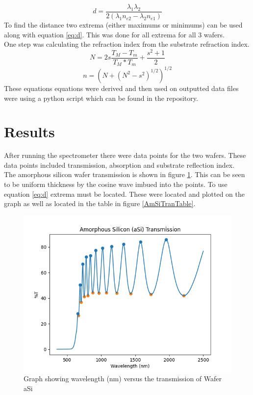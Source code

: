 \documentclass[10pt,a4paper]{article}
\begin{document}
\begin{multicols}{2}
\begin{equation}
\label{eq:d}
d = \frac{\lambda_1 \lambda_2}{2(\lambda_1 n_{e2} - \lambda_2 n_{e1})}
\end{equation}
To find the distance two extrema (either maximums or minimums) can be used along with equation \ref{eq:d}. This was done for all extrema for all 3 wafers.\\


One step was calculating the refraction index from the substrate refraction index. \cite{GaN}
\begin{equation}\label{eq:N}
N = 2s \frac{T_M -T_m}{T_M*T_m} + \frac{s^2+1}{2}
\end{equation}
\begin{equation}\label{eq:n}
n = (N + (N^2-s^2)^{1/2})^{1/2}
\end{equation}
These equations equations were derived and then used on outputted data files were using a python script which can be found in the repository.










\section*{Results}
After running the spectrometer there were data points for the two wafers. These data points included transmission, absorption and substrate reflection index.\\
The amorphous silicon wafer transmission is shown in figure \ref{AmSiTran}. This can be seen to be uniform thickness by the cosine wave imbued into the points. To use equation \ref{eq:d} extrema must be located. These were located and plotted on the graph as well as located in the table in figure \ref{AmSiTranTable}.

\begin{figure}[H]\label{AmSiTran}
\includegraphics[scale=0.5]{AmorphousSilicon}
\caption{Graph showing wavelength (nm) versus the transmission of Wafer aSi}
\end{figure}


\end{multicols}
\end{document}
